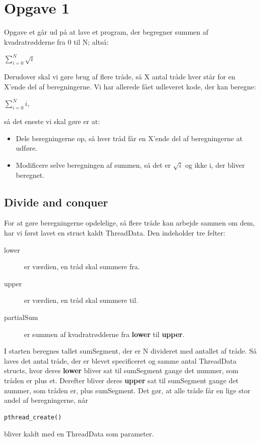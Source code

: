 \section{Opgave 1}
Opgave et går ud på at lave et program, der begregner summen af kvadratrødderne fra 0 til N; altså:
\begin{center}
$\displaystyle\sum_{i=0}^{N} \sqrt{i}$
\end{center}
Derudover skal vi gøre brug af flere tråde, så X antal tråde hver står for en X'ende del af beregningerne. Vi har allerede fået udleveret kode, der kan beregne:

\begin{center}
$\displaystyle\sum_{i=0}^{N} i$,
\end{center}
så det eneste vi skal gøre er at:

\begin{itemize}
\item Dele beregningerne op, så hver tråd får en X'ende del af beregningerne at udføre.
\item Modificere selve beregningen af summen, så det er $\sqrt{i}$ og ikke i, der bliver beregnet.
\end{itemize}

\subsection{Divide and conquer}
For at gøre beregningerne opdelelige, så flere tråde kan arbejde sammen om dem, har vi først lavet en struct kaldt ThreadData. Den indeholder tre felter:
\begin{description}
\item[lower] er værdien, en tråd skal summere fra.
\item[upper] er værdien, en tråd skal summere til.
\item[partialSum] er summen af kvadratrødderne fra \textbf{lower} til \textbf{upper}. 
\end{description}

I starten beregnes tallet sumSegment, der er N divideret med antallet af tråde. Så laves det antal tråde, der er blevet specificeret og samme antal ThreadData structs, hvor deres \textbf{lower} bliver sat til sumSegment gange det nummer, som tråden er plus et. Derefter bliver deres \textbf{upper} sat til sumSegment gange det nummer, som tråden er, plus sumSegment. Det gør, at alle tråde får en lige stor andel af beregningerne, når \begin{verbatim}pthread_create()\end{verbatim} bliver kaldt med en ThreadData som parameter. 

